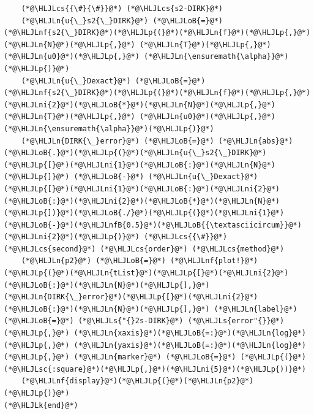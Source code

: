 \documentclass[12pt,a4paper]{article}
\newcommand{\HLJLk}[1]{\textcolor[RGB]{148,91,176}{\textbf{#1}}}
\newcommand{\HLJLn}[1]{#1}
\newcommand{\HLJLnf}[1]{\textcolor[RGB]{66,102,213}{#1}}
\newcommand{\HLJLs}[1]{\textcolor[RGB]{201,61,57}{#1}}
\newcommand{\HLJLsc}[1]{\textcolor[RGB]{201,61,57}{#1}}
\newcommand{\HLJLnfB}[1]{\textcolor[RGB]{59,151,46}{#1}}
\newcommand{\HLJLni}[1]{\textcolor[RGB]{59,151,46}{#1}}
\newcommand{\HLJLoB}[1]{\textcolor[RGB]{102,102,102}{\textbf{#1}}}
\newcommand{\HLJLp}[1]{#1}
\newcommand{\HLJLcs}[1]{\textcolor[RGB]{153,153,119}{\textit{#1}}}
\begin{document}
\begin{lstlisting}
    (*@\HLJLcs{{\#}{\#}}@*) (*@\HLJLcs{s2-DIRK}@*)
    (*@\HLJLn{u{\_}s2{\_}DIRK}@*) (*@\HLJLoB{=}@*) (*@\HLJLnf{s2{\_}DIRK}@*)(*@\HLJLp{(}@*)(*@\HLJLn{f}@*)(*@\HLJLp{,}@*) (*@\HLJLn{N}@*)(*@\HLJLp{,}@*) (*@\HLJLn{T}@*)(*@\HLJLp{,}@*) (*@\HLJLn{u0}@*)(*@\HLJLp{,}@*) (*@\HLJLn{\ensuremath{\alpha}}@*)(*@\HLJLp{)}@*)
    (*@\HLJLn{u{\_}Dexact}@*) (*@\HLJLoB{=}@*) (*@\HLJLnf{s2{\_}DIRK}@*)(*@\HLJLp{(}@*)(*@\HLJLn{f}@*)(*@\HLJLp{,}@*) (*@\HLJLni{2}@*)(*@\HLJLoB{*}@*)(*@\HLJLn{N}@*)(*@\HLJLp{,}@*) (*@\HLJLn{T}@*)(*@\HLJLp{,}@*) (*@\HLJLn{u0}@*)(*@\HLJLp{,}@*) (*@\HLJLn{\ensuremath{\alpha}}@*)(*@\HLJLp{)}@*)
    (*@\HLJLn{DIRK{\_}error}@*) (*@\HLJLoB{=}@*) (*@\HLJLn{abs}@*)(*@\HLJLoB{.}@*)(*@\HLJLp{(}@*)(*@\HLJLn{u{\_}s2{\_}DIRK}@*)(*@\HLJLp{[}@*)(*@\HLJLni{1}@*)(*@\HLJLoB{:}@*)(*@\HLJLn{N}@*)(*@\HLJLp{]}@*) (*@\HLJLoB{-}@*) (*@\HLJLn{u{\_}Dexact}@*)(*@\HLJLp{[}@*)(*@\HLJLni{1}@*)(*@\HLJLoB{:}@*)(*@\HLJLni{2}@*)(*@\HLJLoB{:}@*)(*@\HLJLni{2}@*)(*@\HLJLoB{*}@*)(*@\HLJLn{N}@*)(*@\HLJLp{])}@*)(*@\HLJLoB{./}@*)(*@\HLJLp{(}@*)(*@\HLJLni{1}@*)(*@\HLJLoB{-}@*)(*@\HLJLnfB{0.5}@*)(*@\HLJLoB{{\textasciicircum}}@*)(*@\HLJLni{2}@*)(*@\HLJLp{)}@*) (*@\HLJLcs{{\#}}@*) (*@\HLJLcs{second}@*) (*@\HLJLcs{order}@*) (*@\HLJLcs{method}@*)
    (*@\HLJLn{p2}@*) (*@\HLJLoB{=}@*) (*@\HLJLnf{plot!}@*)(*@\HLJLp{(}@*)(*@\HLJLn{tList}@*)(*@\HLJLp{[}@*)(*@\HLJLni{2}@*)(*@\HLJLoB{:}@*)(*@\HLJLn{N}@*)(*@\HLJLp{],}@*) (*@\HLJLn{DIRK{\_}error}@*)(*@\HLJLp{[}@*)(*@\HLJLni{2}@*)(*@\HLJLoB{:}@*)(*@\HLJLn{N}@*)(*@\HLJLp{],}@*) (*@\HLJLn{label}@*) (*@\HLJLoB{=}@*) (*@\HLJLs{"{}2s-DIRK}@*) (*@\HLJLs{error"{}}@*)(*@\HLJLp{,}@*) (*@\HLJLn{xaxis}@*)(*@\HLJLoB{=:}@*)(*@\HLJLn{log}@*)(*@\HLJLp{,}@*) (*@\HLJLn{yaxis}@*)(*@\HLJLoB{=:}@*)(*@\HLJLn{log}@*)(*@\HLJLp{,}@*) (*@\HLJLn{marker}@*) (*@\HLJLoB{=}@*) (*@\HLJLp{(}@*)(*@\HLJLsc{:square}@*)(*@\HLJLp{,}@*)(*@\HLJLni{5}@*)(*@\HLJLp{))}@*)
    (*@\HLJLnf{display}@*)(*@\HLJLp{(}@*)(*@\HLJLn{p2}@*)(*@\HLJLp{)}@*)
(*@\HLJLk{end}@*)
\end{lstlisting}
\end{document}
